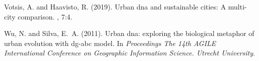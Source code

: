 \documentclass[letterpaper]{article}
\begin{document}
\begin{thebibliography}{}
Votsis, A. and Haavisto, R. (2019).
\newblock Urban dna and sustainable cities: A multi-city comparison.
, 7:4.

Wu, N. and Silva, E.~A. (2011).
\newblock Urban dna: exploring the biological metaphor of urban evolution with
  dg-abc model.
\newblock In {\em Proceedings The 14th AGILE International Conference on
  Geographic Information Science. Utrecht University}.

\end{thebibliography}
\end{document}
